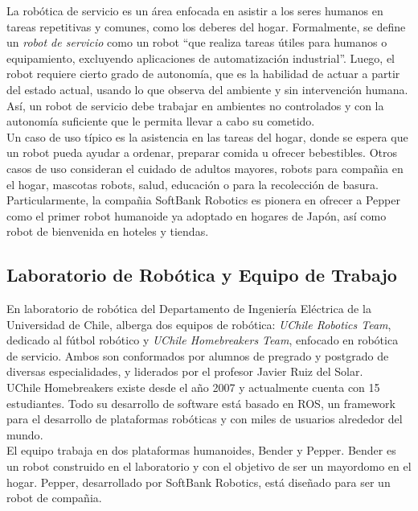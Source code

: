 \documentclass[12pt,letterpaper,spanish]{article}
\begin{document}
La rob\'otica de servicio es un \'area enfocada en asistir a los seres humanos en tareas repetitivas y comunes, como los deberes del hogar. Formalmente, se define un \textit{robot de servicio} como un robot ``que realiza tareas \'utiles para humanos o equipamiento, excluyendo aplicaciones de automatizaci\'on industrial''\cite{IFR}. Luego, el robot requiere cierto grado de autonom\'ia, que es la habilidad de actuar a partir del estado actual, usando lo que observa del ambiente y sin intervenci\'on humana. As\'i, un robot de servicio debe trabajar en ambientes no controlados y con la autonom\'ia suficiente que le permita llevar a cabo su cometido.\\

Un caso de uso t\'ipico es la asistencia en las tareas del hogar, donde se espera que un robot pueda ayudar a ordenar, preparar comida u ofrecer bebestibles. Otros casos de uso consideran el cuidado de adultos mayores, robots para compa\~nia en el hogar, mascotas robots, salud, educaci\'on o para la recolecci\'on de basura. Particularmente, la compa\~nia SoftBank Robotics es pionera en ofrecer a Pepper como el primer robot humanoide ya adoptado en hogares de Jap\'on, as\'i como robot de bienvenida en hoteles y tiendas\cite{softbank}.\\


\subsection{Laboratorio de Rob\'otica y Equipo de Trabajo}

En laboratorio de rob\'otica del Departamento de Ingenier\'ia El\'ectrica de la Universidad de Chile, alberga dos equipos de rob\'otica: \textit{UChile Robotics Team}, dedicado al fútbol rob\'otico y \textit{UChile Homebreakers Team}, enfocado en rob\'otica de servicio. Ambos son conformados por alumnos de pregrado y postgrado de diversas especialidades, y liderados por el profesor Javier Ruiz del Solar\cite{uchile-robotics}.\\

UChile Homebreakers existe desde el a\~no 2007 y actualmente cuenta con 15 estudiantes. Todo su desarrollo de software est\'a basado en ROS, un framework para el desarrollo de plataformas rob\'oticas y con miles de usuarios alrededor del mundo\cite{ROS:2009}.\\

El equipo trabaja en dos plataformas humanoides, Bender y Pepper. Bender es un robot construido en el laboratorio y con el objetivo de ser un mayordomo en el hogar. Pepper, desarrollado por SoftBank Robotics, est\'a dise\~nado para ser un robot de compa\~nia.\\
\end{document}
